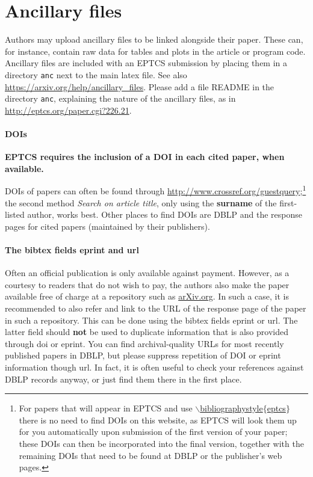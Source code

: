\documentclass[submission,copyright,creativecommons]{eptcs}
\begin{document}
\section{Ancillary files}

Authors may upload ancillary files to be linked alongside their paper.
These can, for instance, contain raw data for tables and plots in the
article or program code.  Ancillary files are included with an EPTCS
submission by placing them in a directory \texttt{anc} next to the
main latex file. See also \url{https://arxiv.org/help/ancillary_files}.
Please add a file README in the directory \texttt{anc}, explaining the
nature of the ancillary files, as in
\url{http://eptcs.org/paper.cgi?226.21}.


\paragraph{DOIs}


{\bfseries EPTCS requires the inclusion of a DOI in each cited paper, when available.}

DOIs of papers can often be found through
\url{http://www.crossref.org/guestquery};\footnote{For papers that will appear
  in EPTCS and use \href{http://eptcs.web.cse.unsw.edu.au/eptcs.bst}
  {\ttfamily $\backslash$bibliographystyle$\{$eptcs$\}$} there is no need to
  find DOIs on this website, as EPTCS will look them up for you
  automatically upon submission of the first version of your paper;
  these DOIs can then be incorporated into the final version, together
  with the remaining DOIs that need to be found at DBLP or the publisher's web pages.}
the second method {\itshape Search on article title}, only using the {\bfseries
surname} of the first-listed author, works best.
Other places to find DOIs are DBLP and the response pages for cited
papers (maintained by their publishers).

\paragraph{The bibtex fields {\ttfamily eprint} and {\ttfamily url}}

Often an official publication is only available against payment. However,
as a courtesy to readers that do not wish to pay, the authors also
make the paper available free of charge at a repository such as
\url{arXiv.org}. In such a case, it is recommended to also refer and
link to the URL of the response page of the paper in such a
repository.  This can be done using the bibtex fields {\ttfamily eprint}
or {\ttfamily url}.  The latter field should \textbf{not} be used
to duplicate information that is also provided through {\ttfamily doi} or {\ttfamily eprint}.
You can find archival-quality URLs for most recently published papers
in DBLP, but please suppress repetition of DOI or {\ttfamily eprint} information though {\ttfamily url}.
In fact, it is often useful to check your references against DBLP records anyway,
or just find them there in the first place.
\end{document}
